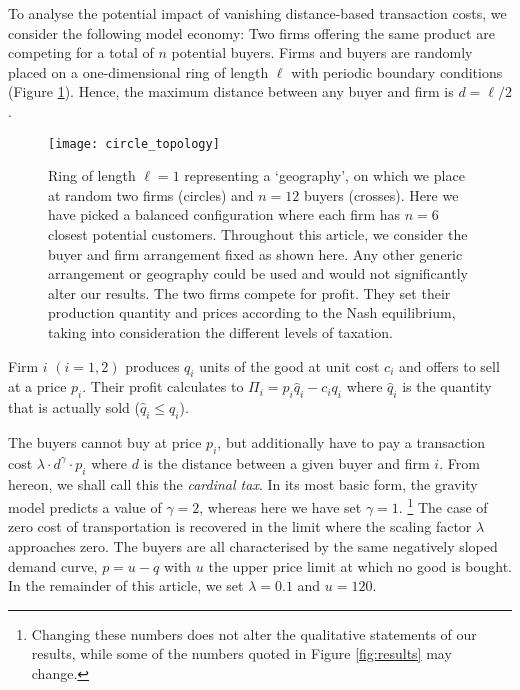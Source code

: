 \documentclass[final,5p,times,twocolumn,11pt,authoryear]{elsarticle}
\numberwithin{equation}{section} %
\begin{document}
To analyse the potential impact of vanishing distance-based transaction costs, we consider the following model economy: 
Two firms offering the same product are competing for a total of $n$ potential buyers. 
Firms and buyers are randomly placed on a one-dimensional ring of length $\ell$ with periodic boundary conditions (Figure \ref{fig:topology}). 
Hence, the maximum distance between any buyer and firm is $d=\ell/2$. 

\begin{figure}[!htb]
	\centering
	\texttt{[image: circle\_topology]}
	\caption{	Ring of length $\ell=1$ representing a `geography', on which we place at random two firms (circles) and $n=12$ buyers (crosses). 
			Here we have picked a balanced configuration where each firm has $n=6$ closest potential customers. 
			Throughout this article, we consider the buyer and firm arrangement fixed as shown here. 
			Any other generic arrangement or geography could be used and would not significantly alter our results.
			The two firms compete for profit.
			They set their production quantity and prices according to the Nash equilibrium, 
			taking into consideration the different levels of taxation. 
			}
	\label{fig:topology}
\end{figure}


Firm $i$ $(i=1,2)$ produces $q_i$ units of the good at unit cost $c_i$ and offers to sell at a price $p_i$. 
Their profit calculates to $\Pi_i = p_i \hat{q}_i - c_i q_i$ where $\hat{q}_i$ is the quantity that is actually sold ($\hat{q}_i \leqslant q_i$). 

The buyers cannot buy at price $p_i$, but additionally have to pay a transaction cost $\lambda \cdot d^\gamma \cdot p_i$ where $d$ is the distance between a given buyer and firm $i$. 
From hereon, we shall call this the \textit{cardinal tax}. 
In its most basic form, the gravity model predicts a value of $\gamma=2$, whereas here we have set $\gamma=1$.  
\footnote{
\label{ftn:wlog}
Changing these numbers does not alter the qualitative statements of our results, 
while some of the numbers quoted in Figure \ref{fig:results} may change.
} 
The case of zero cost of transportation is recovered in the limit where the scaling factor $\lambda$ approaches zero. 
The buyers are all characterised by the same negatively sloped demand curve, $p = u - q$ with $u$ the upper price limit at which no good is bought.
In the remainder of this article, we set $\lambda = 0.1$ and $u = 120$. 
\end{document}
